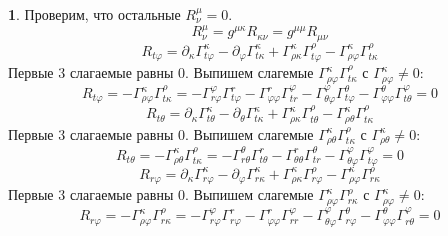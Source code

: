\documentclass[12pt]{article}
\theoremstyle{definition}
\newtheorem{zad}{}[section]
\begin{document}
\begin{zad}
Проверим, что остальные $R^\mu_\nu=0$.
\begin{equation}
    R^\mu_\nu=g^{\mu\kappa}R_{\kappa\nu}=g^{\mu\mu}R_{\mu\nu}
\end{equation}
\begin{equation}
    R_{t\varphi}=\partial_\kappa\Gamma^\kappa_{t\varphi}-\partial_\varphi\Gamma^\kappa_{t\kappa}+\Gamma^\kappa_{\rho\kappa}\Gamma^\rho_{t\varphi}-\Gamma^\kappa_{\rho\varphi}\Gamma^\rho_{t\kappa}
\end{equation}
Первые 3 слагаемые равны 0. Выпишем слагемые $\Gamma^\kappa_{\rho\varphi}\Gamma^\rho_{t\kappa}$ с $\Gamma^\kappa_{\rho\varphi}\neq0$:
\begin{equation}
    R_{t\varphi}=-\Gamma^\kappa_{\rho\varphi}\Gamma^\rho_{t\kappa}=-\Gamma^\varphi_{r\varphi}\Gamma^r_{t\varphi}-\Gamma^r_{\varphi\varphi}\Gamma^\varphi_{tr}-\Gamma^\varphi_{\theta\varphi}\Gamma^\theta_{t\varphi}-\Gamma^\theta_{\varphi\varphi}\Gamma^\varphi_{t\theta}=0
\end{equation}
\begin{equation}
    R_{t\theta}=\partial_\kappa\Gamma^\kappa_{t\theta}-\partial_\theta\Gamma^\kappa_{t\kappa}+\Gamma^\kappa_{\rho\kappa}\Gamma^\rho_{t\theta}-\Gamma^\kappa_{\rho\theta}\Gamma^\rho_{t\kappa}
\end{equation}
Первые 3 слагаемые равны 0. Выпишем слагемые $\Gamma^\kappa_{\rho\theta}\Gamma^\rho_{t\kappa}$ с $\Gamma^\kappa_{\rho\theta}\neq0$:
\begin{equation}
    R_{t\theta}=-\Gamma^\kappa_{\rho\theta}\Gamma^\rho_{t\kappa}=-\Gamma^\theta_{r\theta}\Gamma^r_{t\theta}-\Gamma^r_{\theta\theta}\Gamma^\theta_{tr}-\Gamma^\varphi_{\theta\varphi}\Gamma^\varphi_{t\varphi}=0
\end{equation}
\begin{equation}
    R_{r\varphi}=\partial_\kappa\Gamma^\kappa_{r\varphi}-\partial_\varphi\Gamma^\kappa_{r\kappa}+\Gamma^\kappa_{\rho\kappa}\Gamma^\rho_{r\varphi}-\Gamma^\kappa_{\rho\varphi}\Gamma^\rho_{r\kappa}
\end{equation}
Первые 3 слагаемые равны 0. Выпишем слагемые $\Gamma^\kappa_{\rho\varphi}\Gamma^\rho_{r\kappa}$ с $\Gamma^\kappa_{\rho\varphi}\neq0$:
\begin{equation}
    R_{r\varphi}=-\Gamma^\kappa_{\rho\varphi}\Gamma^\rho_{r\kappa}=-\Gamma^\varphi_{r\varphi}\Gamma^r_{r\varphi}-\Gamma^r_{\varphi\varphi}\Gamma^\varphi_{rr}-\Gamma^\varphi_{\theta\varphi}\Gamma^\theta_{r\varphi}-\Gamma^\theta_{\varphi\varphi}\Gamma^\varphi_{r\theta}=0
\end{equation}

\end{zad}
\end{document}
